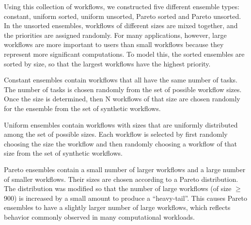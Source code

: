 \documentclass[conference]{IEEEtran}
\begin{document}
Using this collection of workflows, we constructed five different ensemble types:
%
constant, uniform sorted, uniform unsorted, Pareto sorted and Pareto unsorted.
In the unsorted ensembles, workflows of different sizes are mixed together, and
the priorities are assigned randomly.
For many applications, however, large workflows are
more important to users than small workflows because they represent more
significant computations. To model this, the sorted ensembles are sorted by
size, so that the largest workflows have the highest priority.


Constant ensembles contain workflows that all have the same number of tasks. 
The number of tasks is chosen randomly from the set of
possible workflow sizes. Once the size is determined, then N workflows of that
size are chosen randomly for the ensemble from the set of synthetic workflows.


Uniform ensembles contain workflows with sizes that are uniformly distributed
among the set of possible sizes. Each workflow 
is selected by first randomly choosing the size the workflow
and then randomly choosing a workflow of that size from the set of
synthetic workflows.


Pareto ensembles contain a small number of larger workflows and a large number
of smaller workflows. Their sizes  
are chosen according to a Pareto distribution. The distribution was modified so
that the number of large workflows (of size $\geq$ 900) is increased by a small amount to
produce a ``heavy-tail''. This causes Pareto ensembles to have a slightly larger
number of large workflows, which reflects behavior commonly observed in many
computational workloads. 


\end{document}
